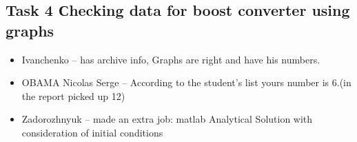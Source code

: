 \documentclass[a4paper,landscape,11pt]{article}
\begin{document}
\subsection{Task 4 Сhecking data for boost converter using graphs}
\begin{itemize}
\item Ivanchenko -- has archive info, Graphs are right and have his numbers.

\item OBAMA Nicolas Serge -- According to the student's list yours number is 6.(in the report picked up 12)

\item Zadorozhnyuk -- made an extra job: matlab Analytical Solution with consideration of initial conditions


\end{itemize}
\end{document}
